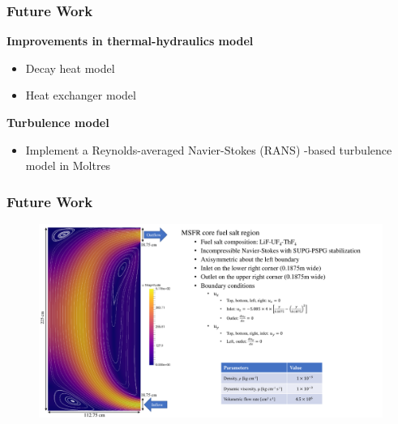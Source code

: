 \begin{frame}
	\frametitle{Future Work}
		\textbf{Improvements in thermal-hydraulics model}
		\begin{itemize}
			\item Decay heat model
			\item Heat exchanger model
		\end{itemize}
		
		\vspace{.3cm}
		\textbf{Turbulence model}
		\begin{itemize}
			\item Implement a Reynolds-averaged Navier-Stokes (RANS) -based
			turbulence model in Moltres
		\end{itemize}
\end{frame}

\begin{frame}
	\frametitle{Future Work}
		\begin{figure}
			\centering
			\includegraphics[width=\textwidth]{./images/flow}
		\end{figure}
\end{frame}
